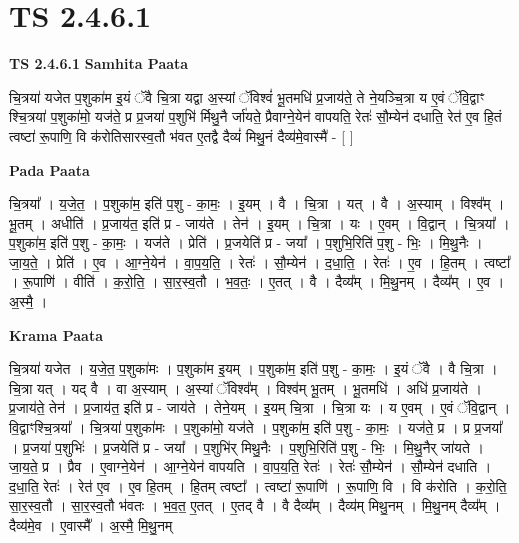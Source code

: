 \documentclass[17pt]{extarticle}
\begin{document}
\section*{ TS 2.4.6.1 }

\textbf{TS 2.4.6.1 } \newline
\textbf{Samhita Paata} \newline

चि॒त्रया॑ यजेत प॒शुका॑म इ॒यं ॅवै चि॒त्रा यद्वा अ॒स्यां ॅविश्वं॑ भू॒तमधि॑ प्र॒जाय॑ते॒ ते ने॒यञ्चि॒त्रा य ए॒वं ॅवि॒द्वाꣳ श्चि॒त्रया॑ प॒शुका॑मो॒ यज॑ते॒ प्र प्र॒जया॑ प॒शुभि॑ र्मिथु॒नै र्जा॑यते॒ प्रैवाग्ने॒येन॑ वापयति॒ रेतः॑ सौ॒म्येन॑ दधाति॒ रेत॑ ए॒व हि॒तं त्वष्टा॑ रू॒पाणि॒ वि क॑रोतिसारस्व॒तौ भ॑वत ए॒तद्वै दैव्यं॑ मिथु॒नं दैव्य॑मे॒वास्मै॑ - [  ] \newline

\textbf{Pada Paata} \newline

चि॒त्रया᳚ । य॒जे॒त॒ । प॒शुका॑म॒ इति॑ प॒शु - का॒मः॒ । इ॒यम् । वै । चि॒त्रा । यत् । वै । अ॒स्याम् । विश्व᳚म् । भू॒तम् । अधीति॑ । प्र॒जाय॑त॒ इति॑ प्र - जाय॑ते । तेन॑ । इ॒यम् । चि॒त्रा । यः । ए॒वम् । वि॒द्वान् । चि॒त्रया᳚ । प॒शुका॑म॒ इति॑ प॒शु - का॒मः॒ । यज॑ते । प्रेति॑ । प्र॒जयेति॑ प्र - जया᳚ । प॒शुभि॒रिति॑ प॒शु - भिः॒ । मि॒थु॒नैः । जा॒य॒ते॒ । प्रेति॑ । ए॒व । आ॒ग्ने॒येन॑ । वा॒प॒य॒ति॒ । रेतः॑ । सौ॒म्येन॑ । द॒धा॒ति॒ । रेतः॑ । ए॒व । हि॒तम् । त्वष्टा᳚ । रू॒पाणि॑ । वीति॑ । क॒रो॒ति॒ । सा॒र॒स्व॒तौ । भ॒व॒तः॒ । ए॒तत् । वै । दैव्य᳚म् । मि॒थु॒नम् । दैव्य᳚म् । ए॒व । अ॒स्मै॒ ।  \newline


\textbf{Krama Paata} \newline

चि॒त्रया॑ यजेत । य॒जे॒त॒ प॒शुका॑मः । प॒शुका॑म इ॒यम् । प॒शुका॑म॒ इति॑ प॒शु - का॒मः॒ । इ॒यं ॅवै । वै चि॒त्रा । चि॒त्रा यत् । यद् वै । वा अ॒स्याम् । अ॒स्यां ॅविश्व᳚म् । विश्व॑म् भू॒तम् । भू॒तमधि॑ । अधि॑ प्र॒जाय॑ते । प्र॒जाय॑ते॒ तेन॑ । प्र॒जाय॑त॒ इति॑ प्र - जाय॑ते । तेने॒यम् । इ॒यम् चि॒त्रा । चि॒त्रा यः । य ए॒वम् । ए॒वं ॅवि॒द्वान् । वि॒द्वाꣳश्चि॒त्रया᳚ । चि॒त्रया॑ प॒शुका॑मः । प॒शुका॑मो॒ यज॑ते । प॒शुका॑म॒ इति॑ प॒शु - का॒मः॒ । यज॑ते॒ प्र । प्र प्र॒जया᳚ । प्र॒जया॑ प॒शुभिः॑ । 
प्र॒जयेति॑ प्र - जया᳚ । प॒शुभि॑र् मिथु॒नैः । प॒शुभि॒रिति॑ प॒शु - भिः॒ । मि॒थु॒नैर् जा॑यते । जा॒य॒ते॒ प्र । प्रैव । ए॒वाग्ने॒येन॑ । आ॒ग्ने॒येन॑ वापयति । वा॒प॒य॒ति॒ रेतः॑ । रेतः॑ सौ॒म्येन॑ । सौ॒म्येन॑ दधाति । द॒धा॒ति॒ रेतः॑ । रेत॑ ए॒व । ए॒व हि॒तम् । हि॒तम् त्वष्टा᳚ । त्वष्टा॑ रू॒पाणि॑ । रू॒पाणि॒ वि । वि क॑रोति । क॒रो॒ति॒ सा॒र॒स्व॒तौ । सा॒र॒स्व॒तौ भ॑वतः । भ॒व॒त॒ ए॒तत् । ए॒तद् वै । वै दैव्य᳚म् । दैव्य॑म् मिथु॒नम् । मि॒थु॒नम् दैव्य᳚म् । दैव्य॑मे॒व । ए॒वास्मै᳚ । अ॒स्मै॒ मि॒थु॒नम् \newline
\end{document}
